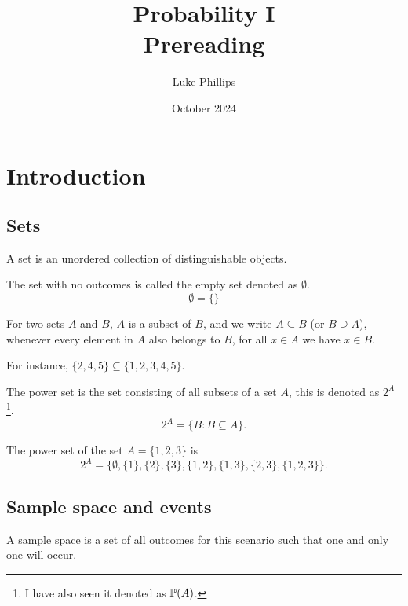 \documentclass[10pt, a4paper]{article}
\title{Probability I \\
    \large Prereading}
\author{Luke Phillips}
\date{October 2024}
\begin{document}
\maketitle

\newpage

\tableofcontents

\newpage

\section{Introduction}

\subsection{Sets}

A set is an unordered collection of distinguishable objects. 

\begin{definition}
    The set with no outcomes is called the empty set denoted as $\emptyset$.
    \[
    \emptyset = \{\}
    \]
\end{definition}

\begin{definition}[Subset]
    For two sets $A$ and $B$, $A$ is a subset of $B$, and we write $A \subseteq B$ (or $B \supseteq A$), whenever every element in $A$ also belongs to $B$, for all $x \in A$ we have $x \in B$.
\end{definition}

\begin{example}
    For instance, $\{2, 4, 5\} \subseteq \{1, 2, 3, 4, 5\}$.    
\end{example}

\begin{definition}
    The power set is the set consisting of all subsets of a set $A$, this is denoted as $2 ^ A$\footnote{I have also seen it denoted as $\P(A)$.}.
    \[
    2 ^ A = \{B: B \subseteq A\}.
    \]
\end{definition}

\begin{example}
    The power set of the set $A = \{1, 2, 3\}$ is
    \[
    2 ^ A = \{\emptyset, \{1\}, \{2\}, \{3\}, \{1, 2\}, \{1, 3\}, \{2, 3\}, \{1, 2, 3\}\}.
    \]
\end{example}

\subsection{Sample space and events}
A sample space is a set of all outcomes for this scenario such that one and only one will occur.
\end{document}
